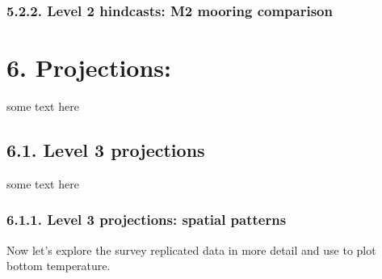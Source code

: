\documentclass[
]{article}
\begin{document}
\hypertarget{level-2-hindcasts-m2-mooring-comparison}{%
\subsubsection{5.2.2. Level 2 hindcasts: M2 mooring
comparison}\label{level-2-hindcasts-m2-mooring-comparison}}

\hypertarget{projections}{%
\section{6. Projections:}\label{projections}}

some text here

\hypertarget{level-3-projections}{%
\subsection{6.1. Level 3 projections}\label{level-3-projections}}

some text here

\hypertarget{level-3-projections-spatial-patterns}{%
\subsubsection{6.1.1. Level 3 projections: spatial
patterns}\label{level-3-projections-spatial-patterns}}

Now let's explore the survey replicated data in more detail and use to
plot bottom temperature.
\end{document}
